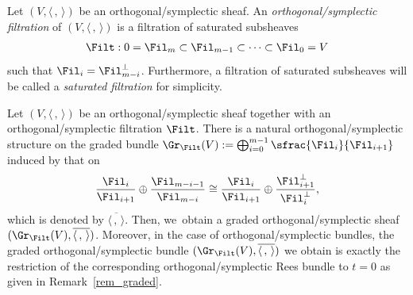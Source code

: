 \begin{defn}
Let $(V,\langle \,, \, \rangle)$ be an orthogonal/symplectic sheaf. An \emph{orthogonal/symplectic filtration} of $(V,\langle \,, \, \rangle)$ is a filtration of saturated subsheaves
\begin{align*}
\Filt: 0=\Fil_m \subset \Fil_{m-1} \subset \cdots \subset \Fil_0=V
\end{align*}
such that $\Fil_{i}= \Fil_{m-i}^\perp$. Furthermore, a filtration of saturated subsheaves will be called a \emph{saturated filtration} for simplicity.
\end{defn}

\begin{rem}
Let $(V, \langle \,, \, \rangle)$ be an orthogonal/symplectic sheaf together with an orthogonal/symplectic filtration $\Filt$. There is a natural orthogonal/symplectic structure on the graded bundle
$\Gr_{\Filt}(V):=\mathop{\bigoplus}_{i=0}^{m-1}\sfrac{\Fil_i} {\Fil_{i+1}}$ induced by that on
\begin{align*}
\frac{\Fil_i}{\Fil_{i+1}} \oplus \frac{\Fil_{m-i-1}}{\Fil_{m-i}} \cong \frac{\Fil_{i}}{\Fil_{i+1}} \oplus \frac{\Fil^\perp_{i+1}}{\Fil^\perp_{i}},
\end{align*}
which is denoted by $\overline{\langle \,, \, \rangle}$. Then, we~obtain a graded orthogonal/symplectic sheaf $(\Gr_{\Filt}(V), \overline{\langle \,, \, \rangle})$. Moreover, in the case of orthogonal/symplectic bundles, the graded orthogonal/symplectic bundle $(\Gr_{\Filt}(V), \overline{\langle \,, \, \rangle})$ we obtain is exactly the restriction of the corresponding orthogonal/symplectic Rees bundle to $t=0$ as given in Remark~\ref{rem_graded}.
\end{rem}

\label{subsect_log_lambda_conn}

